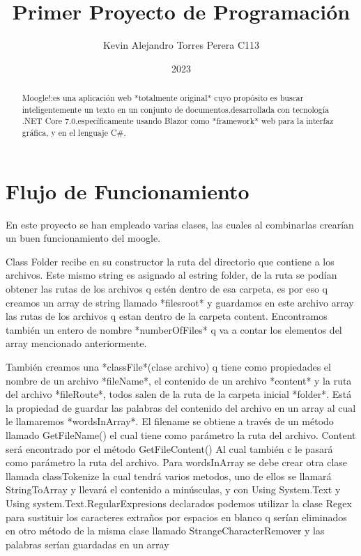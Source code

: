 \documentclass[a4paper,12pt]{article}
\begin{document}
\title{Primer Proyecto de Programación}
\author{Kevin Alejandro Torres Perera C113}
\date{2023}
\maketitle



 \begin{abstract}
 Moogle!:es una aplicación web *totalmente original* cuyo propósito es buscar inteligentemente un texto en un conjunto
de documentos.desarrollada con tecnología .NET Core 7.0,específicamente usando Blazor como *framework* web para la interfaz
gráfica, y en el lenguaje C$\#$.
\end{abstract}



\section{Flujo de Funcionamiento}

En este proyecto se han empleado varias clases, las cuales al combinarlas crearían un buen funcionamiento del moogle.

Class Folder recibe en su constructor la ruta del directorio que contiene a los archivos. Este mismo string es asignado al estring folder, de la ruta se podían obtener las rutas de los archivos q estén dentro de esa carpeta, es por eso q creamos un array de string llamado *filesroot* y guardamos en este archivo array las rutas de los archivos q estan dentro de la carpeta content. Encontramos también un entero de nombre *numberOfFiles* q va a contar los elementos del array mencionado anteriormente. 

También creamos una *classFile*(clase archivo) q tiene   como propiedades el nombre de un archivo *fileName*, el contenido de un archivo *content* y la ruta del archivo *fileRoute*, todos salen de la ruta de la carpeta inicial *folder*. Está la propiedad de guardar las palabras del contenido del archivo en un array al cual le llamaremos *wordsInArray*. El filename se obtiene a través de un método llamado GetFileName() el cual tiene como parámetro la ruta del archivo. Content será encontrado por el método GetFileContent() Al cual también c le pasará como parámetro la ruta del archivo. Para wordsInArray se debe crear otra clase llamada classTokenize la cual tendrá varios metodos, uno de ellos se llamará StringToArray y llevará el contenido a minúsculas, y con Using System.Text y Using system.Text.RegularExpresions declarados podemos utilizar la clase Regex para sustituir los caracteres extraños por espacios en blanco q serían eliminados en otro método de la misma clase llamado StrangeCharacterRemover y las palabras serían guardadas en un array
\end{document}
